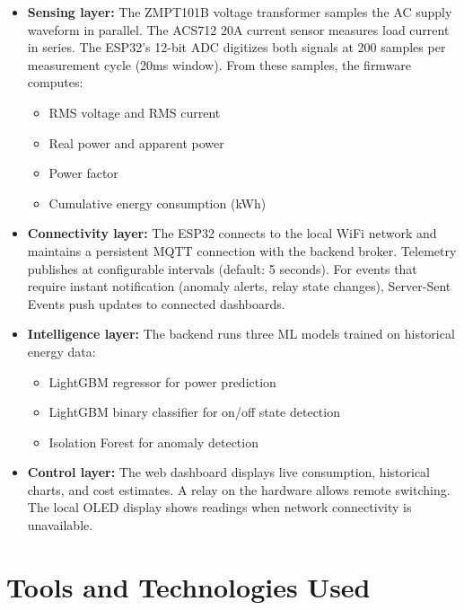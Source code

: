 \documentclass[12pt, a4paper]{article}
\begin{document}
	\begin{itemize}[itemsep=3pt, topsep=4pt]
		\item \textbf{Sensing layer:} The ZMPT101B voltage transformer samples the AC supply waveform in parallel. The ACS712 20A current sensor measures load current in series. The ESP32's 12-bit ADC digitizes both signals at 200 samples per measurement cycle (20ms window). From these samples, the firmware computes:
		\begin{itemize}[itemsep=2pt, topsep=4pt]
			\item RMS voltage and RMS current
			\item Real power and apparent power
			\item Power factor
			\item Cumulative energy consumption (kWh)
		\end{itemize}
		
		\item \textbf{Connectivity layer:} The ESP32 connects to the local WiFi network and maintains a persistent MQTT connection with the backend broker. Telemetry publishes at configurable intervals (default: 5 seconds). For events that require instant notification (anomaly alerts, relay state changes), Server-Sent Events push updates to connected dashboards.
		
		\item \textbf{Intelligence layer:} The backend runs three ML models trained on historical energy data:
		\begin{itemize}[itemsep=2pt, topsep=4pt]
			\item LightGBM regressor for power prediction
			\item LightGBM binary classifier for on/off state detection
			\item Isolation Forest for anomaly detection
		\end{itemize}
		
		\item \textbf{Control layer:} The web dashboard displays live consumption, historical charts, and cost estimates. A relay on the hardware allows remote switching. The local OLED display shows readings when network connectivity is unavailable.
	\end{itemize}
	
	\newpage
	
	\section{Tools and Technologies Used}
	
\end{document}
